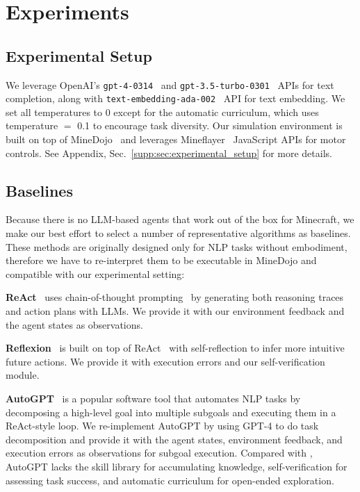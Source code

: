 \section{Experiments}
\label{sec:experiments}

\subsection{Experimental Setup} 
We leverage OpenAI's \texttt{gpt-4-0314}~\cite{openai2023gpt4} and \texttt{gpt-3.5-turbo-0301}~\cite{chatgpt} APIs for text completion, along with \texttt{text-embedding-ada-002}~\cite{embedding} API for text embedding. We set all temperatures to 0 except for the automatic curriculum, which uses temperature $=$ 0.1 to encourage task diversity. Our simulation environment is built on top of MineDojo~\cite{fan2022minedojo} and leverages Mineflayer~\cite{mineflayer} JavaScript APIs for motor controls. See Appendix, Sec.~\ref{supp:sec:experimental_setup} for more details.

\subsection{Baselines}
Because there is no LLM-based agents that work out of the box for Minecraft, we make our best effort to select a number of representative algorithms as baselines. These methods are originally designed only for NLP tasks without embodiment, therefore we have to re-interpret them to be executable in MineDojo and compatible with our experimental setting:

\textbf{ReAct}~\cite{yao2022react} uses chain-of-thought prompting~\cite{wei2022chain} by generating both reasoning traces and action plans with LLMs. We provide it with our environment feedback and the agent states as observations. 

\textbf{Reflexion}~\cite{shinn2023reflexion} is built on top of ReAct~\cite{yao2022react} with self-reflection to infer more intuitive future actions. We provide it with execution errors and our self-verification module.

\textbf{AutoGPT}~\cite{autogpt} is a popular software tool that automates NLP tasks by decomposing a high-level goal into multiple subgoals and executing them in a ReAct-style loop. We re-implement AutoGPT by using GPT-4 to do task decomposition and provide it with the agent states, environment feedback, and execution errors as observations for subgoal execution. Compared with \voyager, AutoGPT lacks the skill library for accumulating knowledge, self-verification for assessing task success, and automatic curriculum for open-ended exploration.

